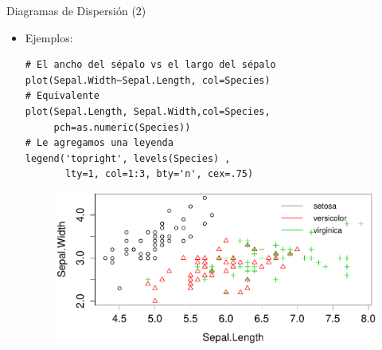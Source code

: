 \documentclass[handout]{beamer}
\begin{document}
\begin{frame}[fragile]{Diagramas de Dispersión (2)}
\scriptsize{
\begin{itemize}
 \item Ejemplos:
 \begin{verbatim}
# El ancho del sépalo vs el largo del sépalo  
plot(Sepal.Width~Sepal.Length, col=Species)
# Equivalente
plot(Sepal.Length, Sepal.Width,col=Species,
     pch=as.numeric(Species))
# Le agregamos una leyenda
legend('topright', levels(Species) , 
       lty=1, col=1:3, bty='n', cex=.75)  
 \end{verbatim}

  \begin{figure}[h!]
	\centering
	\includegraphics[scale=0.5]{pics/scatter1.pdf}		
\end{figure} 
 
 
\end{itemize}




}
 
\end{frame}
\end{document}
